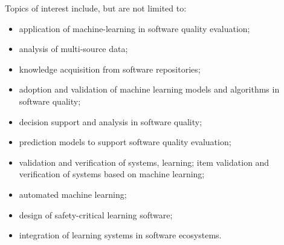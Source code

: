 Topics of interest include, but are not limited to:
\begin{itemize}
    \item application of machine-learning in software quality evaluation;
    \item analysis of multi-source data;
    \item knowledge acquisition from software repositories;
    \item adoption and validation of machine learning models and algorithms in software quality;
    \item decision support and analysis in software quality;
    \item prediction models to support software quality evaluation;
    \item validation and verification of systems, learning;
    item  validation and verification of systems based on machine learning;
    \item automated machine learning;
    \item design of safety-critical learning software;
    \item integration of learning systems in software ecosystems.
\end{itemize}
